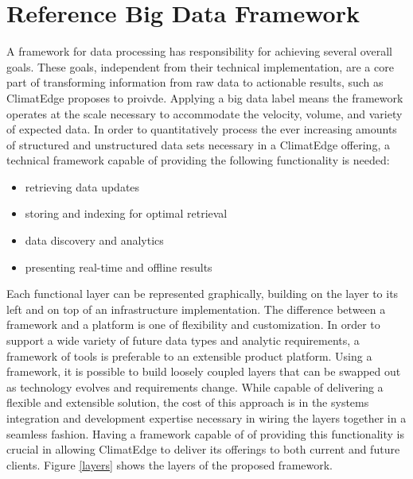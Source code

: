 \section{Reference Big Data Framework}
A framework for data processing has responsibility for achieving several overall goals. These goals, independent from their technical implementation, are a core part of transforming information from raw data to actionable results, such as ClimatEdge proposes to proivde. Applying a big data label means the framework operates at the scale necessary to accommodate the velocity, volume, and variety of expected data. In order to quantitatively process the ever increasing amounts of structured and unstructured data sets necessary in a ClimatEdge offering, a technical framework capable of providing the following functionality is needed:
\begin{itemize}
	\item retrieving data updates
	\item storing and indexing for optimal retrieval
	\item data discovery and analytics
	\item presenting real-time and offline results
\end{itemize}
Each functional layer can be represented graphically, building on the layer to its left and on top of an infrastructure implementation. The difference between a framework and a platform is one of flexibility and customization.  In order to support a wide variety of future data types and analytic requirements, a framework of tools is preferable to an extensible product platform. Using a framework, it is possible to build loosely coupled layers that can be swapped out as technology evolves and requirements change. While capable of delivering a flexible and extensible solution, the cost of this approach is in the systems integration and development expertise necessary in wiring the layers together in a seamless fashion. Having a framework capable of of providing this functionality is crucial in allowing ClimatEdge to deliver its offerings to both current and future clients. Figure \ref{layers} shows the layers of the proposed framework.
